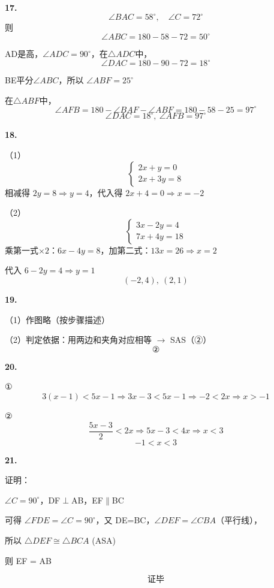 \textbf{17.}
\[
\angle BAC=58^\circ,\quad \angle C=72^\circ
\]
则
\[
\angle ABC = 180-58-72=50^\circ
\]

AD是高，\(\angle ADC=90^\circ\)，在\(\triangle ADC\)中，
\[
\angle DAC = 180-90-72 = 18^\circ
\]

BE平分\(\angle ABC\)，所以 \(\angle ABF=25^\circ\)

在\(\triangle ABF\)中，
\[
\angle AFB = 180 - \angle BAF - \angle ABF = 180 - 58 - 25 = 97^\circ
\]
\[
\boxed{\angle DAC=18^\circ,\ \angle AFB=97^\circ}
\]

\bigskip

\textbf{18.}

（1）
\[
\begin{cases}
2x+y=0 \\
2x+3y=8
\end{cases}
\]
相减得 \(2y=8 \Rightarrow y=4\)，代入得 \(2x+4=0 \Rightarrow x=-2\)

（2）
\[
\begin{cases}
3x-2y=4 \\
7x+4y=18
\end{cases}
\]
乘第一式\(\times 2\)：\(6x-4y=8\)，加第二式：\(13x=26 \Rightarrow x=2\)

代入 \(6-2y=4 \Rightarrow y=1\)
\[
\boxed{(-2,4),\ (2,1)}
\]

\bigskip

\textbf{19.}

（1）作图略（按步骤描述）

（2）判定依据：用两边和夹角对应相等 \(\rightarrow\) SAS（②）
\[
\boxed{②}
\]

\bigskip

\textbf{20.}

①
\[
3(x-1) < 5x-1 \Rightarrow 3x-3 < 5x-1 \Rightarrow -2 < 2x \Rightarrow x > -1
\]

②
\[
\frac{5x-3}{2} < 2x \Rightarrow 5x-3 < 4x \Rightarrow x < 3
\]
\[
\boxed{-1 < x < 3}
\]

\bigskip

\textbf{21.}

证明：

\(\angle C=90^\circ\)，DF\(\perp\)AB，EF\(\parallel\)BC

可得 \(\angle FDE = \angle C = 90^\circ\)，又 DE=BC，\(\angle DEF = \angle CBA\)（平行线），

所以 \(\triangle DEF \cong \triangle BCA\) (ASA)

则 EF = AB

\[
\textbf{证毕}
\]

\bigskip

